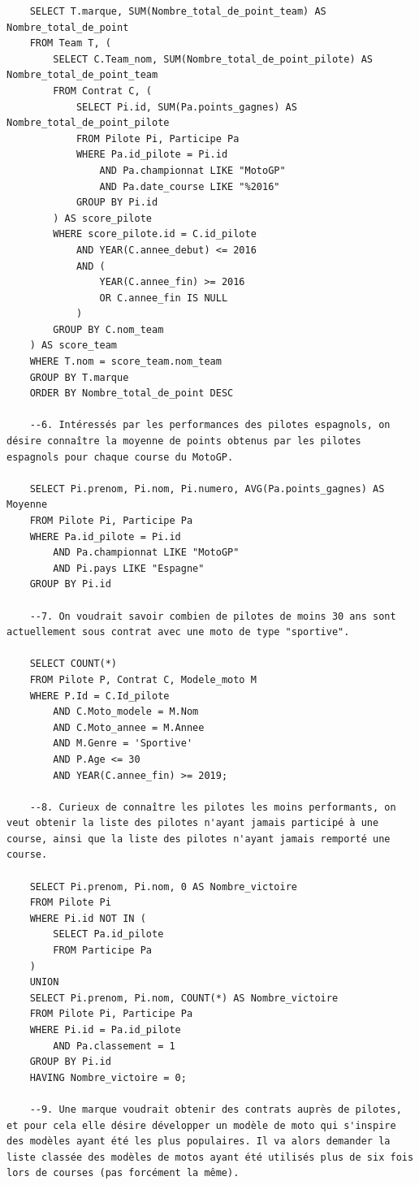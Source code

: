 \documentclass[12pt,a4paper]{article}
\newenvironment{code}{\captionsetup{type=listing}}{}
\begin{document}
\begin{code}
\begin{verbatim}
    SELECT T.marque, SUM(Nombre_total_de_point_team) AS Nombre_total_de_point
    FROM Team T, (
        SELECT C.Team_nom, SUM(Nombre_total_de_point_pilote) AS Nombre_total_de_point_team
        FROM Contrat C, (
            SELECT Pi.id, SUM(Pa.points_gagnes) AS Nombre_total_de_point_pilote
            FROM Pilote Pi, Participe Pa
            WHERE Pa.id_pilote = Pi.id
                AND Pa.championnat LIKE "MotoGP"
                AND Pa.date_course LIKE "%2016"
            GROUP BY Pi.id
        ) AS score_pilote
        WHERE score_pilote.id = C.id_pilote
            AND YEAR(C.annee_debut) <= 2016
            AND (
                YEAR(C.annee_fin) >= 2016
                OR C.annee_fin IS NULL
            )
        GROUP BY C.nom_team
    ) AS score_team
    WHERE T.nom = score_team.nom_team
    GROUP BY T.marque
    ORDER BY Nombre_total_de_point DESC

    --6. Intéressés par les performances des pilotes espagnols, on désire connaître la moyenne de points obtenus par les pilotes espagnols pour chaque course du MotoGP.

    SELECT Pi.prenom, Pi.nom, Pi.numero, AVG(Pa.points_gagnes) AS Moyenne
    FROM Pilote Pi, Participe Pa
    WHERE Pa.id_pilote = Pi.id
        AND Pa.championnat LIKE "MotoGP"
        AND Pi.pays LIKE "Espagne"
    GROUP BY Pi.id

    --7. On voudrait savoir combien de pilotes de moins 30 ans sont actuellement sous contrat avec une moto de type "sportive".

    SELECT COUNT(*)
    FROM Pilote P, Contrat C, Modele_moto M
    WHERE P.Id = C.Id_pilote
        AND C.Moto_modele = M.Nom
        AND C.Moto_annee = M.Annee
        AND M.Genre = 'Sportive'
        AND P.Age <= 30
        AND YEAR(C.annee_fin) >= 2019;

    --8. Curieux de connaître les pilotes les moins performants, on veut obtenir la liste des pilotes n'ayant jamais participé à une course, ainsi que la liste des pilotes n'ayant jamais remporté une course.

    SELECT Pi.prenom, Pi.nom, 0 AS Nombre_victoire
    FROM Pilote Pi
    WHERE Pi.id NOT IN (
        SELECT Pa.id_pilote
        FROM Participe Pa
    )
    UNION
    SELECT Pi.prenom, Pi.nom, COUNT(*) AS Nombre_victoire
    FROM Pilote Pi, Participe Pa
    WHERE Pi.id = Pa.id_pilote
        AND Pa.classement = 1
    GROUP BY Pi.id
    HAVING Nombre_victoire = 0;

    --9. Une marque voudrait obtenir des contrats auprès de pilotes, et pour cela elle désire développer un modèle de moto qui s'inspire des modèles ayant été les plus populaires. Il va alors demander la liste classée des modèles de motos ayant été utilisés plus de six fois lors de courses (pas forcément la même).


\end{verbatim}
\end{code}
\end{document}
